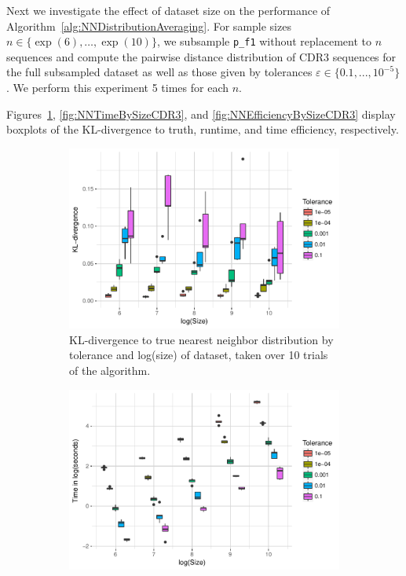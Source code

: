 \documentclass{article}
\begin{document}
Next we investigate the effect of dataset size on the performance of Algorithm~\ref{alg:NNDistributionAveraging}.
For sample sizes $n \in \{\exp(6), \dots, \exp(10)\}$, we subsample \texttt{p\_f1} without replacement to $n$ sequences and compute the pairwise distance distribution of CDR3 sequences for the full subsampled dataset as well as those given by tolerances $\varepsilon \in \{0.1, ..., 10^{-5}\}$.
We perform this experiment 5 times for each $n$.

Figures~\ref{fig:NNDivBySizeCDR3}, \ref{fig:NNTimeBySizeCDR3}, and \ref{fig:NNEfficiencyBySizeCDR3} display boxplots of the KL-divergence to truth, runtime, and time efficiency, respectively.
\begin{figure}
	\begin{subfigure}{0.5\textwidth}
    	\includegraphics[width=\linewidth]{Figures/NearestNeighbor/CDR3/div_by_size_and_tol.pdf}
    	\caption{KL-divergence to true nearest neighbor distribution by tolerance and log(size) of dataset, taken over 10 trials of the algorithm.}
    	\label{fig:NNDivBySizeCDR3}
	\end{subfigure}
	\begin{subfigure}{0.5\textwidth}
    	\includegraphics[width=\linewidth]{Figures/NearestNeighbor/CDR3/time_by_size_and_tol.pdf}

\end{subfigure}
\end{figure}
\end{document}
